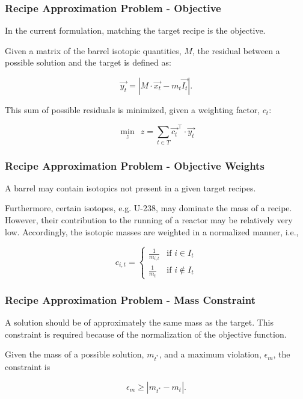 \begin{frame}[ctb!]
  \frametitle{Recipe Approximation Problem - Objective}

  In the current formulation, matching the target recipe is the objective.

  Given a matrix of the barrel isotopic quantities, $M$, the residual between a
  possible solution and the target is defined as:
  
  \begin{equation}\label{eqs:residual}
    \vec{y_{t}} = \left| M \cdot \vec{x_{t}}  - m_t \vec{I_{t}} \right|.
  \end{equation}

  This sum of possible residuals is minimized, given a weighting factor, $c_t$:
  
  \begin{equation}\label{rap-obj}
    \min_{z} \:\: z = \sum_{t \in T} \vec{c_{t}}^{\top} \cdot \vec{y_{t}}
  \end{equation}
\end{frame}

\begin{frame}[ctb!]
  \frametitle{Recipe Approximation Problem - Objective Weights}

  A barrel may contain isotopics not present in a given target recipes.\vspace{0.2cm}

  Furthermore, certain isotopes, e.g. U-238, may dominate the mass of a
  recipe. However, their contribution to the running of a reactor may be
  relatively very low. Accordingly, the isotopic masses are weighted in a
  normalized manner, i.e.,

  \begin{equation}\label{eqs:weights}
    c_{i,t} = 
    \begin{cases}
      \frac{1}{m_{i,t}} & \text{if } i \in I_{t} \\
      \frac{1}{m_{t}}   & \text{if } i \not\in I_{t}
    \end{cases}
  \end{equation}  
\end{frame}

\begin{frame}[ctb!]
  \frametitle{Recipe Approximation Problem - Mass Constraint}

  A solution should be of approximately the same mass as the target. This
  constraint is required because of the normalization of the objective function.

  Given the mass of a possible solution, $m_{t^*}$, and a maximum violation,
  $\epsilon_{m}$, the constraint is
  
  \begin{equation}\label{eqs:mass-constraint-simple}
    \epsilon_{m} \geq \left| m_{t^*} - m_{t} \right|.
  \end{equation}
\end{frame}


